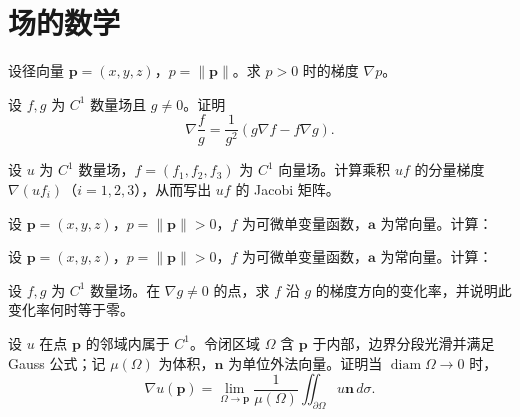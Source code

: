 \renewcommand{\thesection}{\arabic{section}}\renewcommand{\theHsection}{chapter.\arabic{section}}\setcounter{section}{12}\section{场的数学}
\noindent\begin{minipage}{\textwidth}
设径向量 $\mathbf p=(x,y,z)$，$p=\|\mathbf p\|$。求 $p>0$ 时的梯度 $\nabla p$。
\end{minipage}\par\vfill
\noindent\begin{minipage}{\textwidth}
设 $f,g$ 为 $C^1$ 数量场且 $g\ne0$。证明\[\nabla\frac fg=\frac1{g^2}(g\nabla f-f\nabla g).\]
\end{minipage}\par\vfill
\noindent\begin{minipage}{\textwidth}
设 $u$ 为 $C^1$ 数量场，$f=(f_1,f_2,f_3)$ 为 $C^1$ 向量场。计算乘积 $uf$ 的分量梯度 $\nabla(uf_i)$（$i=1,2,3$），从而写出 $uf$ 的 Jacobi 矩阵。
\end{minipage}\par\vfill
\newpage
\noindent\begin{minipage}{\textwidth}
设 $\mathbf p=(x,y,z)$，$p=\|\mathbf p\|>0$，$f$ 为可微单变量函数，$\mathbf a$ 为常向量。计算：
\end{minipage}\par\vfill
\noindent\begin{minipage}{\textwidth}
设 $\mathbf p=(x,y,z)$，$p=\|\mathbf p\|>0$，$f$ 为可微单变量函数，$\mathbf a$ 为常向量。计算：
\end{minipage}\par\vfill
\noindent\begin{minipage}{\textwidth}
设 $f,g$ 为 $C^1$ 数量场。在 $\nabla g\ne0$ 的点，求 $f$ 沿 $g$ 的梯度方向的变化率，并说明此变化率何时等于零。
\end{minipage}\par\vfill
\newpage
\noindent\begin{minipage}{\textwidth}
设 $u$ 在点 $\mathbf p$ 的邻域内属于 $C^1$。令闭区域 $\Omega$ 含 $\mathbf p$ 于内部，边界分段光滑并满足 Gauss 公式；记 $\mu(\Omega)$ 为体积，$\mathbf n$ 为单位外法向量。证明当 $\operatorname{diam}\Omega\to0$ 时，\[\nabla u(\mathbf p)=\lim_{\Omega\to\mathbf p}\frac1{\mu(\Omega)}\iint_{\partial\Omega}u\mathbf n\,d\sigma.\]
\end{minipage}\par\vfill
